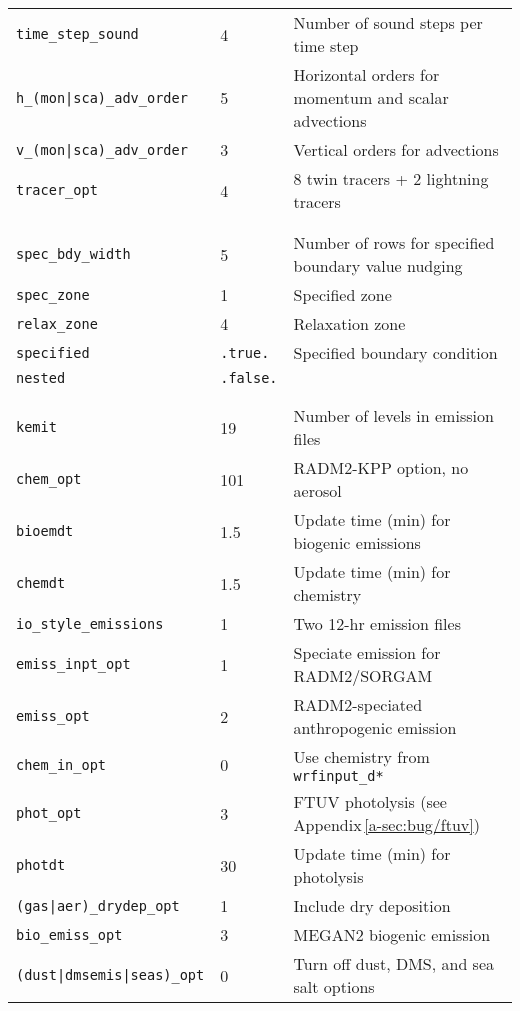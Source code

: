 \begin{singlespacing}
\begin{longtable}{p{2.0in}p{0.9in}p{3.2in}}
{\tt time\_step\_sound} & 4 & Number of sound steps per time step \\
{\tt h\_(mon|sca)\_adv\_order} & 5 & Horizontal orders for momentum and scalar advections \\
{\tt v\_(mon|sca)\_adv\_order} & 3 & Vertical orders for advections\\
{\tt tracer\_opt} & 4 & 8 twin tracers + 2 lightning tracers \\
\\
\hspace{-.2in}{\tt \&bdy\_control} \\
{\tt spec\_bdy\_width} & 5 & Number of rows for specified boundary value nudging \\
{\tt spec\_zone} & 1 & Specified zone \\
{\tt relax\_zone} & 4 & Relaxation zone \\
{\tt specified} & {\tt .true.} & Specified boundary condition \\
{\tt nested} & {\tt .false.} \\
\\
\hspace{-.2in}{\tt \&chem} \\
{\tt kemit} & 19 & Number of levels in emission files \\
{\tt chem\_opt} & 101 & RADM2-KPP option, no aerosol \\
{\tt bioemdt} & 1.5 & Update time (\unit{min}) for biogenic emissions \\
{\tt chemdt} & 1.5 & Update time (\unit{min}) for chemistry \\
{\tt io\_style\_emissions} & 1 & Two 12-hr emission files \\
{\tt emiss\_inpt\_opt} & 1 & Speciate emission for RADM2/SORGAM \\
{\tt emiss\_opt} & 2 & RADM2-speciated anthropogenic emission \\
{\tt chem\_in\_opt} & 0 & Use chemistry from \texttt{wrfinput\_d*} \\
{\tt phot\_opt} & 3 & FTUV photolysis (see Appendix\,\ref{a-sec:bug/ftuv})\\
{\tt photdt} & 30 & Update time (\unit{min}) for photolysis \\
{\tt (gas|aer)\_drydep\_opt} & 1 & Include dry deposition \\
{\tt bio\_emiss\_opt} & 3 & MEGAN2 biogenic emission \\
{\tt (dust|dmsemis|seas)\_opt} & 0 & Turn off dust, DMS, and sea salt options \\

\end{longtable}
\end{singlespacing}
